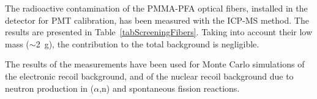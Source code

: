 The radioactive contamination of the PMMA-PFA optical fibers, installed in the detector for PMT calibration, has been measured with the ICP-MS method. The results are presented in Table~\ref{tabScreeningFibers}. Taking into account their low mass ($\sim$2~g), the contribution to the total background is negligible.


The results of the measurements have been used for Monte Carlo simulations of the electronic recoil background, and of the nuclear recoil background due to neutron production in ($\alpha$,n) and spontaneous fission reactions.



